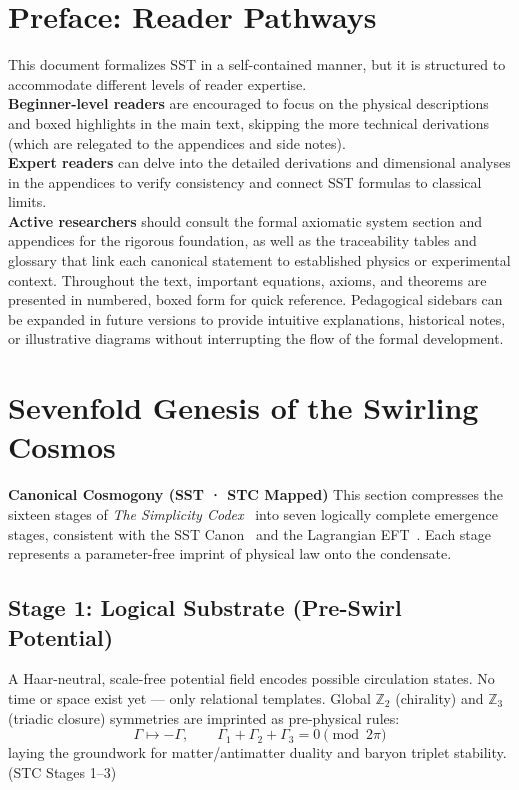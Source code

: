 \documentclass[10pt,reprint,aps,onecolumn,nofootinbib]{revtex4-2}
\renewcommand{\cftsecfont}{\footnotesize}
\renewcommand{\cftsubsecfont}{\footnotesize\itshape}
\newcommand{\compacttoc}{%
  \begingroup
  \setlength{\cftparskip}{0pt}%
  \setlength{\cftbeforesecskip}{0.5pt}%
  \setlength{\cftbeforesubsecskip}{0.5pt}%
  \renewcommand{\cftsecfont}{\scriptsize}%
  \renewcommand{\cftsubsecfont}{\scriptsize\itshape}%
  \renewcommand{\cftsecpagefont}{\scriptsize}%
  \renewcommand{\cftsubsecpagefont}{\scriptsize}%
  \setlength{\cftsecnumwidth}{1.4em}%
  \setlength{\cftsubsecindent}{1.4em}%
  \renewcommand{\cftdotsep}{2}%
  \setlength{\parskip}{0pt}%
  \linespread{0.80}\selectfont
  \tableofcontents
  \endgroup
}
\begin{document}
    	\section*{Preface: Reader Pathways}
	This document formalizes SST in a self-contained manner, but it is structured to accommodate different levels of reader expertise.\\
        \textbf{Beginner-level readers} are encouraged to focus on the physical descriptions and boxed highlights in the main text, skipping the more technical derivations (which are relegated to the appendices and side notes).\\
        \textbf{Expert readers} can delve into the detailed derivations and dimensional analyses in the appendices to verify consistency and connect SST formulas to classical limits.\\
        \textbf{Active researchers} should consult the formal axiomatic system section and appendices for the rigorous foundation, as well as the traceability tables and glossary that link each canonical statement to established physics or experimental context. Throughout the text, important equations, axioms, and theorems are presented in numbered, boxed form for quick reference. Pedagogical sidebars can be expanded in future versions to provide intuitive explanations, historical notes, or illustrative diagrams without interrupting the flow of the formal development.



        \newpage
        \compacttoc
        \newpage
\section{Sevenfold Genesis of the Swirling Cosmos}
\label{sec:cosmogony-seven}

\noindent
\textbf{Canonical Cosmogony (SST · STC Mapped)}
This section compresses the sixteen stages of \emph{The Simplicity Codex}~\cite{Goldau2025_STC}
into seven logically complete emergence stages, consistent with the SST Canon~\canonversion{}
and the Lagrangian EFT~\cite{Iskandarani2025_Lagrangian}.
Each stage represents a parameter-free imprint of physical law onto the condensate.

\subsection*{Stage 1: Logical Substrate (Pre-Swirl Potential)}
A Haar-neutral, scale-free potential field encodes possible circulation states.
No time or space exist yet — only relational templates.
Global $\mathbb{Z}_2$ (chirality) and $\mathbb{Z}_3$ (triadic closure) symmetries are imprinted as pre-physical rules:
\[
\Gamma \mapsto -\Gamma,
\qquad
\Gamma_1 + \Gamma_2 + \Gamma_3 = 0 \pmod{2\pi}
\]
laying the groundwork for matter/antimatter duality and baryon triplet stability.
\hfill (STC Stages 1–3)
\end{document}
